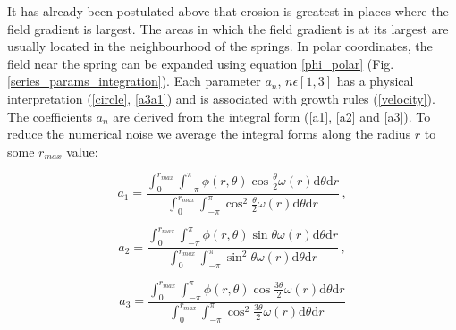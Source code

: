 \documentclass[]{pracamgr}
\begin{document}
      It has already been postulated above that erosion is greatest in places where the field gradient is largest. The areas in which the field gradient is at its largest are usually located in the neighbourhood of the springs. In polar coordinates, the field near the spring can be expanded using equation \ref{phi_polar} (Fig. \ref{series_params_integration}). Each parameter $a_n$, $n \epsilon [1, 3]$ has a physical interpretation (\ref{circle}, \ref{a3a1}) and is associated with growth rules (\ref{velocity}). The coefficients $a_n$ are derived from the integral form (\ref{a1}, \ref{a2} and \ref{a3}). To reduce the numerical noise we average the integral forms along the radius $r$ to some $r_{max}$ value:
      
      \begin{equation}
        \label{a1_num}
        a_1 = \frac{\int^{r_{max}}_{0} \int^{\pi}_{-\pi} \phi(r, \theta) \cos \frac{\theta}{2} \omega(r) \textrm{d} \theta \textrm{d} r}{\int^{r_{max}}_{0} \int^{\pi}_{-\pi} \cos^2 \frac{\theta}{2} \omega(r) \textrm{d} \theta \textrm{d} r} \,,
      \end{equation} 
      
      \begin{equation}
        \label{a2_num}
        a_2 = \frac{\int^{r_{max}}_{0} \int^{\pi}_{-\pi} \phi(r, \theta) \sin \theta \omega(r) \textrm{d} \theta \textrm{d} r}{\int^{r_{max}}_{0} \int^{\pi}_{-\pi} \sin^2 \theta \omega(r) \textrm{d} \theta \textrm{d} r} \,,
      \end{equation}
      
      \begin{equation}
        \label{a3_num}
        a_3 = \frac{\int^{r_{max}}_{0} \int^{\pi}_{-\pi} \phi(r, \theta) \cos \frac{3 \theta}{2} \omega(r) \textrm{d} \theta \textrm{d} r}{\int^{r_{max}}_{0} \int^{\pi}_{-\pi} \cos^2 \frac{3 \theta}{2} \omega(r) \textrm{d} \theta \textrm{d} r}
      \end{equation}	
\end{document}
